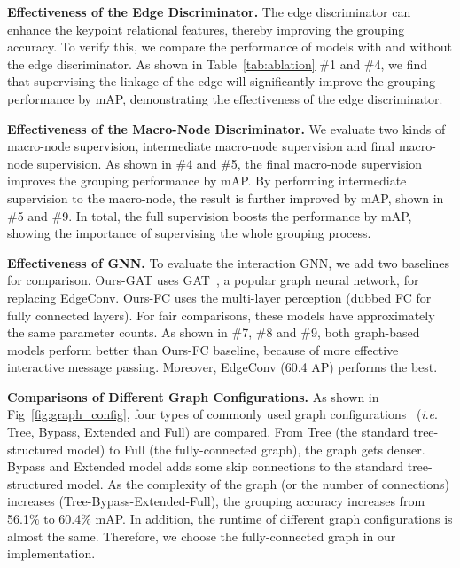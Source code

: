\documentclass[runningheads]{llncs}
\newcommand{\ie}{\textit{i}.\textit{e}. }
\begin{document}
	\textbf{Effectiveness of the Edge Discriminator.}
	The edge discriminator can enhance the keypoint relational features, thereby improving the grouping accuracy.
	To verify this, we compare the performance of models with and without the edge discriminator. As shown in Table~\ref{tab:ablation} \#1 and \#4, we find that supervising the linkage of the edge will significantly improve the grouping performance by  mAP, demonstrating the effectiveness of the edge discriminator.
	
	\textbf{Effectiveness of the Macro-Node Discriminator.}
	We evaluate two kinds of macro-node supervision, intermediate macro-node supervision and final macro-node supervision. As shown in \#4 and \#5, the final macro-node supervision improves the grouping performance by  mAP. By performing intermediate supervision to the macro-node, the result is further improved by  mAP, shown in \#5 and \#9. In total, the full supervision boosts the performance by  mAP, showing the importance of supervising the whole grouping process.  
	
	
	\textbf{Effectiveness of GNN.}
	To evaluate the interaction GNN, we add two baselines for comparison. Ours-GAT uses GAT~\cite{velivckovic2018graph}, a popular graph neural network, for replacing EdgeConv. Ours-FC uses the multi-layer perception (dubbed FC for fully connected layers). For fair comparisons, these models have approximately the same parameter counts. As shown in \#7, \#8 and \#9, both graph-based models perform better than Ours-FC baseline, because of more effective interactive message passing. Moreover, EdgeConv (60.4 AP) performs the best.
	
	
	\textbf{Comparisons of Different Graph Configurations.}
	As shown in Fig~\ref{fig:graph_config}, four types of commonly used graph configurations~\cite{doering2018joint} (\ie Tree, Bypass, Extended and Full) are compared. From Tree (the standard tree-structured model) to Full (the fully-connected graph), the graph gets denser. Bypass and Extended model adds some skip connections to the standard tree-structured model. As the complexity of the graph (or the number of connections) increases (Tree-Bypass-Extended-Full), the grouping accuracy increases from 56.1\% to 60.4\% mAP. In addition, the runtime of different graph configurations is almost the same. Therefore, we choose the fully-connected graph in our implementation.
	
\end{document}
